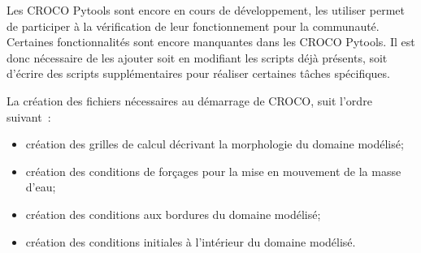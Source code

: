 \documentclass[10pt,a4paper,titlepage]{article}
\begin{document}
Les CROCO Pytools sont encore en cours de développement, les utiliser permet de participer à la vérification de leur fonctionnement pour la communauté.
Certaines fonctionnalités sont encore manquantes dans les CROCO Pytools. Il est donc nécessaire de les ajouter soit en modifiant les scripts déjà présents, soit d'écrire des scripts supplémentaires pour réaliser certaines tâches spécifiques.

La création des fichiers nécessaires au démarrage de CROCO, suit l'ordre suivant\ :

\begin{itemize}
    \item création des grilles de calcul décrivant la morphologie du domaine modélisé;
    \item création des conditions de forçages pour la mise en mouvement de la masse d'eau;
    \item création des conditions aux bordures du domaine modélisé;
    \item création des conditions initiales à l'intérieur du domaine modélisé.
\end{itemize}
\end{document}
